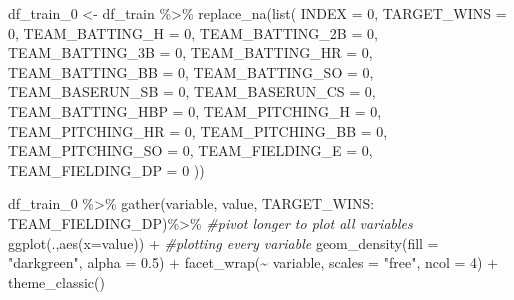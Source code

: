 \documentclass[
]{article}
\newenvironment{Shaded}{\begin{snugshade}}{\end{snugshade}}
\newcommand{\AttributeTok}[1]{\textcolor[rgb]{0.77,0.63,0.00}{#1}}
\newcommand{\CommentTok}[1]{\textcolor[rgb]{0.56,0.35,0.01}{\textit{#1}}}
\newcommand{\DecValTok}[1]{\textcolor[rgb]{0.00,0.00,0.81}{#1}}
\newcommand{\FloatTok}[1]{\textcolor[rgb]{0.00,0.00,0.81}{#1}}
\newcommand{\FunctionTok}[1]{\textcolor[rgb]{0.00,0.00,0.00}{#1}}
\newcommand{\NormalTok}[1]{#1}
\newcommand{\OtherTok}[1]{\textcolor[rgb]{0.56,0.35,0.01}{#1}}
\newcommand{\SpecialCharTok}[1]{\textcolor[rgb]{0.00,0.00,0.00}{#1}}
\newcommand{\StringTok}[1]{\textcolor[rgb]{0.31,0.60,0.02}{#1}}
\begin{document}
\begin{Shaded}
\begin{Highlighting}[]
\NormalTok{df\_train\_0 }\OtherTok{\textless{}{-}}\NormalTok{ df\_train }\SpecialCharTok{\%\textgreater{}\%}
  \FunctionTok{replace\_na}\NormalTok{(}\FunctionTok{list}\NormalTok{(}
    \AttributeTok{INDEX =} \DecValTok{0}\NormalTok{,}
    \AttributeTok{TARGET\_WINS =} \DecValTok{0}\NormalTok{,}
    \AttributeTok{TEAM\_BATTING\_H =} \DecValTok{0}\NormalTok{,}
    \AttributeTok{TEAM\_BATTING\_2B =} \DecValTok{0}\NormalTok{,}
    \AttributeTok{TEAM\_BATTING\_3B =} \DecValTok{0}\NormalTok{,}
    \AttributeTok{TEAM\_BATTING\_HR =} \DecValTok{0}\NormalTok{,}
    \AttributeTok{TEAM\_BATTING\_BB =} \DecValTok{0}\NormalTok{,}
    \AttributeTok{TEAM\_BATTING\_SO =} \DecValTok{0}\NormalTok{,}
    \AttributeTok{TEAM\_BASERUN\_SB =} \DecValTok{0}\NormalTok{,}
    \AttributeTok{TEAM\_BASERUN\_CS =} \DecValTok{0}\NormalTok{,}
    \AttributeTok{TEAM\_BATTING\_HBP =} \DecValTok{0}\NormalTok{,}
    \AttributeTok{TEAM\_PITCHING\_H =} \DecValTok{0}\NormalTok{,}
    \AttributeTok{TEAM\_PITCHING\_HR =} \DecValTok{0}\NormalTok{,}
    \AttributeTok{TEAM\_PITCHING\_BB =} \DecValTok{0}\NormalTok{,}
    \AttributeTok{TEAM\_PITCHING\_SO =} \DecValTok{0}\NormalTok{,}
    \AttributeTok{TEAM\_FIELDING\_E =} \DecValTok{0}\NormalTok{,}
    \AttributeTok{TEAM\_FIELDING\_DP =} \DecValTok{0}
\NormalTok{  ))}
\end{Highlighting}
\end{Shaded}

\begin{Shaded}
\begin{Highlighting}[]
\NormalTok{df\_train\_0 }\SpecialCharTok{\%\textgreater{}\%} 
  \FunctionTok{gather}\NormalTok{(variable, value, TARGET\_WINS}\SpecialCharTok{:}\NormalTok{ TEAM\_FIELDING\_DP)}\SpecialCharTok{\%\textgreater{}\%} \CommentTok{\#pivot longer to plot all variables}
  \FunctionTok{ggplot}\NormalTok{(.,}\FunctionTok{aes}\NormalTok{(}\AttributeTok{x=}\NormalTok{value)) }\SpecialCharTok{+} \CommentTok{\#plotting every variable}
  \FunctionTok{geom\_density}\NormalTok{(}\AttributeTok{fill =} \StringTok{"darkgreen"}\NormalTok{, }\AttributeTok{alpha =} \FloatTok{0.5}\NormalTok{) }\SpecialCharTok{+}
  \FunctionTok{facet\_wrap}\NormalTok{(}\SpecialCharTok{\textasciitilde{}}\NormalTok{ variable, }\AttributeTok{scales =} \StringTok{"free"}\NormalTok{, }\AttributeTok{ncol =} \DecValTok{4}\NormalTok{) }\SpecialCharTok{+}
  \FunctionTok{theme\_classic}\NormalTok{()}
\end{Highlighting}
\end{Shaded}
\end{document}
